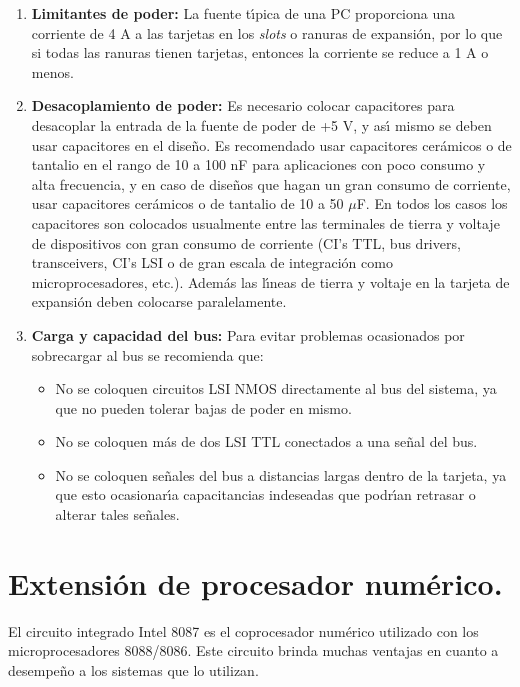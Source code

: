 \begin{enumerate}
\item {\bf Limitantes de poder:} La fuente t\'{\i}pica de una PC proporciona una corriente %
de 4 A a las tarjetas en los {\it slots\/} o ranuras de expansi\'on, por lo que si todas las %
ranuras tienen tarjetas, entonces la corriente se reduce a 1 A o menos.
\item {\bf Desacoplamiento de poder:} Es necesario colocar capacitores para desacoplar la %
entrada de la fuente de poder de +5 V, y as\'{\i} mismo se deben usar capacitores en el %
dise\~no. Es recomendado usar capacitores cer\'amicos o de tantalio en el rango de 10 a 100 nF %
para aplicaciones con poco consumo y alta frecuencia, y en caso de dise\~nos que hagan un gran %
consumo de corriente, usar capacitores cer\'amicos o de tantalio de 10 a 50 $\mu$F. En todos %
los casos los capacitores son colocados usualmente entre las terminales de tierra y voltaje de %
dispositivos con gran consumo de corriente (CI's TTL, bus drivers, transceivers, CI's LSI o de %
gran escala de integraci\'on como microprocesadores, etc.). Adem\'as las l\'{\i}neas de tierra %
y voltaje en la tarjeta de expansi\'on deben colocarse paralelamente.
\item {\bf Carga y capacidad del bus:} Para evitar problemas ocasionados por sobrecargar al %
bus se recomienda que:
\begin{itemize}
\item No se coloquen circuitos LSI NMOS directamente al bus del sistema, ya que no pueden %
tolerar bajas de poder en mismo. 
\item No se coloquen m\'as de dos LSI TTL conectados a una se\~nal del bus.
\item No  se coloquen se\~nales del bus a distancias largas dentro de la tarjeta, ya que esto %
ocasionar\'{\i}a capacitancias indeseadas que podr\'{\i}an retrasar o alterar tales %
se\~nales.
\end{itemize}
\end{enumerate}


\section{Extensi\'on de procesador num\'erico.}
\label{Section:copronum}

El circuito integrado Intel 8087 es el coprocesador num\'erico utilizado con los %
microprocesadores 8088/8086. Este circuito brinda muchas ventajas en cuanto a desempe\~no a los %
sistemas que lo utilizan.

